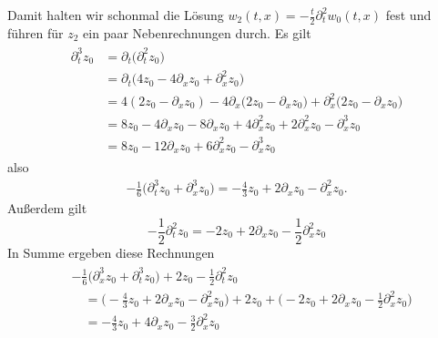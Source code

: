 Damit halten wir schonmal die Lösung $w_2(t,x) = -\frac{t}{2} \partial^2_t w_0(t,x)$ fest und führen für $z_2$ ein paar Nebenrechnungen durch.
Es gilt
\begin{align}
\begin{split}
\partial^3_t z_0 &= \partial_t \bigl( \partial^2_t z_0 \bigr)\\
&= \partial_t \bigl( 4 z_0 - 4 \partial_x z_0 + \partial^2_x z_0 \bigr)\\
&= 4 ( 2z_0 - \partial_x z_0 ) - 4 \partial_x \bigl( 2z_0 - \partial_x z_0 \bigr) + \partial^2_x \bigl( 2 z_0 - \partial_x z_0 \bigr)\\
&= 8z_0 - 4 \partial_x z_0 - 8 \partial_x z_0 + 4 \partial^2_x z_0 + 2 \partial^2_x z_0 - \partial^3_x z_0\\
&= 8 z_0 - 12 \partial_x z_0 + 6 \partial^2_x z_0 - \partial^3_x z_0
\end{split}
\end{align}
also
\begin{align}
- \frac{1}{6} \bigl(\partial^3_t z_0 + \partial^3_x z_0 \bigr)
= -\frac{4}{3} z_0 + 2 \partial_x z_0 - \partial^2_x z_0.
\end{align}
Außerdem gilt
\[ -\frac{1}{2} \partial^2_t z_0 = -2 z_0 + 2 \partial_x z_0 - \frac{1}{2} \partial^2_x z_0 \]
In Summe ergeben diese Rechnungen
\begin{align}
\begin{split}
&- \frac{1}{6} \bigl( \partial^3_x z_0 + \partial^3_t z_0 \bigr) + 2 z_0 - \frac{1}{2} \partial^2_t z_0\\
&\quad = \bigl(-\frac{4}{3} z_0 + 2 \partial_x z_0 - \partial^2_x z_0\bigr) + 2 z_0 + \bigl(-2 z_0 + 2 \partial_x z_0 - \frac{1}{2} \partial^2_x z_0\bigr)\\
&\quad = -\frac{4}{3} z_0 + 4 \partial_x z_0 - \frac{3}{2} \partial^2_x z_0
\end{split}
\end{align}
